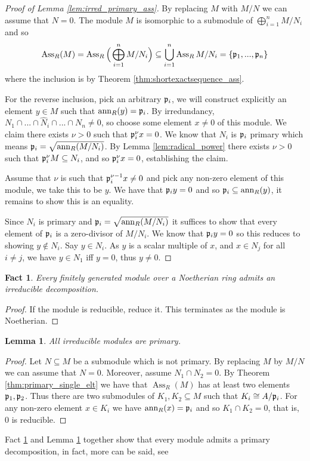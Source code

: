 \documentclass[12pt]{article}
\theoremstyle{plain}
\newtheorem{lemma}[thm]{Lemma}
\newtheorem{fact}[thm]{Fact}
\theoremstyle{definition}
\begin{document}
\begin{proof}[Proof of Lemma \ref{lem:irred_primary_ass}]
By replacing $M$ with $M/N$ we can assume that $N = 0$. The module $M$ is isomorphic to a submodule of $\bigoplus_{i = 1}^nM/N_i$ and so
\[\operatorname{Ass}_R(M) = \operatorname{Ass}_R\Big(\bigoplus_{i = 1}^nM/N_i\Big) \subseteq \bigcup_{i = 1}^n \operatorname{Ass}_RM/N_i = \lbrace \frak{p}_1,...,\frak{p}_n\rbrace\]
where the inclusion is by Theorem \ref{thm:shortexactsequence_ass}.

For the reverse inclusion, pick an arbitrary $\frak{p}_i$, we will construct explicitly an element $y\in M$ such that $\operatorname{ann}_R(y) = \frak{p}_i$. By irredundancy, $N_1 \cap ... \cap \hat{N}_i \cap ... \cap N_n \neq 0$, so choose some element $x \neq 0$ of this module. We claim there exists $\nu > 0$ such that $\frak{p}_i^\nu x = 0$. We know that $N_i$ is $\frak{p}_i$ primary which means $\frak{p}_i = \sqrt{\operatorname{ann}_R(M/N_i)}$. By Lemma \ref{lem:radical_power} there exists $\nu > 0$ such that $\frak{p}_i^\nu M \subseteq N_i$, and so $\frak{p}_i^{\nu}x = 0$, establishing the claim.

Assume that $\nu$ is such that $\frak{p}_i^{\nu - 1}x \neq 0$ and pick any non-zero element of this module, we take this to be $y$. We have that $\frak{p}_iy = 0$ and so $\frak{p}_i \subseteq \operatorname{ann}_R(y)$, it remains to show this is an equality.

Since $N_i$ is primary and $\frak{p}_i = \sqrt{\operatorname{ann}_R(M/N_i)}$ it suffices to show that every element of $\frak{p}_i$ is a zero-divisor of $M/N_i$. We know that $\frak{p}_i y = 0$ so this reduces to showing $y \not\in N_i$. Say $y \in N_i$. As $y$ is a scalar multiple of $x$, and $x \in N_j$ for all $i \neq j$, we have $y \in N_1$ iff $y = 0$, thus $y \neq 0$.
\end{proof}
\begin{fact}
\label{fact:irreducible_decomp} Every finitely generated module over a Noetherian ring admits an irreducible decomposition.
\end{fact}
\begin{proof}
If the module is reducible, reduce it. This terminates as the module is Noetherian.
\end{proof}
\begin{lemma}
\label{lem:irred_primary} All irreducible modules are primary.
\end{lemma}
\begin{proof}
Let $N \subseteq M$ be a submodule which is not primary. By replacing $M$ by $M/N$ we can assume that $N = 0$. Moreover, assume $N_1 \cap N_2 = 0$. By Theorem \ref{thm:primary_single_elt} we have that $\operatorname{Ass}_R(M)$ has at least two elements $\frak{p}_1,\frak{p}_2$. Thus there are two submodules of $K_1,K_2 \subseteq M$ such that $K_i \cong A/\frak{p}_i$. For any non-zero element $x \in K_i$ we have $\operatorname{ann}_R(x) = \frak{p}_i$ and so $K_1 \cap K_2 = 0$, that is, $0$ is reducible.
\end{proof}
Fact \ref{fact:irreducible_decomp} and Lemma \ref{lem:irred_primary} together show that every module admits a primary decomposition, in fact, more can be said, see \cite[\S 2.6 Thm 6.8]{matsumura}
%
\end{document}
